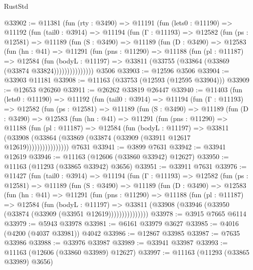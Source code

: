 \begin{lexlean}{RustStd}
\begin{coremodule}
@33902 := @11381
    (fun (rty : @3490) =>
    @11191
      (fun (lets0 : @11190) =>
      @11192
        (fun (tail0 : @3914) =>
        @11194
          (fun (Γ : @11193) =>
          @12582
            (fun (ps : @12581) =>
            @11189
              (fun (S : @3490) =>
              @11189
                (fun (D : @3490) =>
                @12583
                  (fun (hn : @41) =>
                  @11291
                    (fun (pns : @11290) =>
                    @11188
                      (fun (pl : @11187) =>
                      @12584
                        (fun (bodyL : @11197) =>
                        @33811 (@33755 (@33864 (@33869 (@33874 @33824)))))))))))))))
    @3506
@33903 := @12596 @3506
@33904 := @33903 @11181
@33908 := @11163 (@33753 (@12593 (@12595 @33904)))
@33909 := @12653 @26260
@33911 := @26262 @33819 @26447
@33940 := @11403
    (fun (lets0 : @11190) =>
    @11192
      (fun (tail0 : @3914) =>
      @11194
        (fun (Γ : @11193) =>
        @12582
          (fun (ps : @12581) =>
          @11189
            (fun (S : @3490) =>
            @11189
              (fun (D : @3490) =>
              @12583
                (fun (hn : @41) =>
                @11291
                  (fun (pns : @11290) =>
                  @11188
                    (fun (pl : @11187) =>
                    @12584
                      (fun (bodyL : @11197) =>
                      @33811
                        (@33908
                          (@33864 (@33869 (@33874 (@33909 (@33911 @12617 @12619))))))))))))))))
    @7631
@33941 := @3899 @7631
@33942 := @33941 @12619
@33946 := @11163 (@12606 (@33860 @33942) @12627)
@33950 := @11163 (@11293 (@33865 @33942) @3656)
@33951 := @33911 @7631
@33976 := @11427
    (fun (tail0 : @3914) =>
    @11194
      (fun (Γ : @11193) =>
      @12582
        (fun (ps : @12581) =>
        @11189
          (fun (S : @3490) =>
          @11189
            (fun (D : @3490) =>
            @12583
              (fun (hn : @41) =>
              @11291
                (fun (pns : @11290) =>
                @11188
                  (fun (pl : @11187) =>
                  @12584
                    (fun (bodyL : @11197) =>
                    @33811 (@33908 (@33946 (@33950 (@33874 (@33909 (@33951 @12619)))))))))))))))
@33978 := @3915 @7665 @6114
@33979 := @5943 @33978
@33981 := @6161 @33979 @3627
@33985 := @4016 (@4200 (@4037 @33981)) @4042
@33986 := @12867 @33985
@33987 := @7635 @33986
@33988 := @33976 @33987
@33989 := @33941 @33987
@33993 := @11163 (@12606 (@33860 @33989) @12627)
@33997 := @11163 (@11293 (@33865 @33989) @3656)

\end{coremodule}
\end{lexlean}
